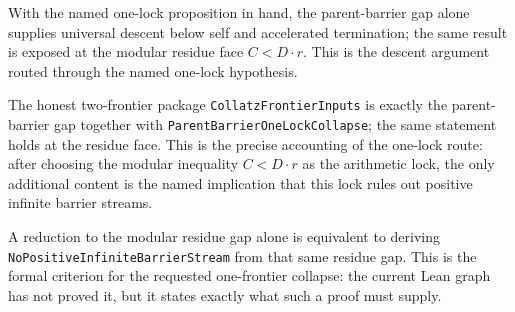\begin{theorem}
  \label{thm:collatz-parent-one-lock-supplies-descent}
  \leanok
  With the named one-lock proposition in hand, the parent-barrier gap alone
  supplies universal descent below self and accelerated termination; the same
  result is exposed at the modular residue face \(C<D\cdot r\). This is the
  descent argument routed through the named one-lock hypothesis.
\end{theorem}
\begin{theorem}
  \label{thm:collatz-frontier-inputs-gap-and-one-lock}
  \leanok
  The honest two-frontier package \texttt{CollatzFrontierInputs} is exactly the
  parent-barrier gap together with \texttt{ParentBarrierOneLockCollapse}; the
  same statement holds at the residue face. This is the precise accounting
  of the one-lock route: after choosing the modular inequality \(C<D\cdot r\) as
  the arithmetic lock, the only additional content is the named implication that
  this lock rules out positive infinite barrier streams.
\end{theorem}
\begin{theorem}
  \label{thm:collatz-one-frontier-criterion}
  \leanok
  A reduction to the modular residue gap alone is equivalent to deriving
  \texttt{NoPositiveInfiniteBarrierStream} from that same residue gap. This is the
  formal criterion for the requested one-frontier collapse: the current Lean graph
  has not proved it, but it states exactly what such a proof must supply.
\end{theorem}
